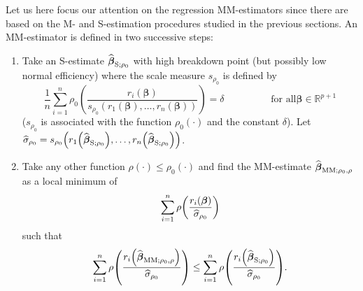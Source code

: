 Let us here focus our attention on the regression MM-estimators since there
are based on the M- and S-estimation procedures studied in the previous
sections. An MM-estimator is defined in two successive steps:

\begin{enumerate}
\item Take an S-estimate $\widehat{\boldsymbol\beta}_{\mathrm{S};\rho_{0}}$
with high breakdown point (but possibly low normal efficiency) where the scale
measure $s_{\rho_{0}}$ is defined by
\[
\frac{1}{n}\sum_{i=1}^{n}\rho_{0}\left(  \frac{r_{i}\left(  \boldsymbol{\beta
}\right)  }{s_{\rho_{0}}\left(  r_{1}(\boldsymbol\beta),\ldots
,r_{n}(\boldsymbol\beta)\right)  }\right)  =\delta\hspace{2cm}\text{for all
}\boldsymbol\beta\in\mathbb{R}^{p+1}%
\]
($s_{\rho_{0}}$ is associated with the function $\rho_{0}\left(  \cdot\right)
$ and the constant $\delta$). Let $\sthat{\sigma}_{\rho_{0}}=s_{\rho_{0}%
}\left(  r_{1}\left(  \sthat{\boldsymbol\beta}_{\mathrm{S};\rho_{0}%
}\right)  ,\ldots,r_{n}\left(  \sthat{\boldsymbol\beta}_{\mathrm{S}%
;\rho_{0}}\right)  \right)  $.

\item Take any other function $\rho\left(  \cdot\right)  \leq\rho_{0}\left(
\cdot\right)  $ and find the MM-estimate $\sthat{\boldsymbol\beta%
}_{\mathrm{MM};\rho_{0},\rho}$ as a local minimum of
\begin{equation}
\sum_{i=1}^{n}\rho\left(  \frac{r_{i}\left(  \boldsymbol\beta\right)
}{\sthat{\sigma}_{\rho_{0}}}\right)  \label{eq:MM_min}%
\end{equation}
such that
\begin{equation}
\sum_{i=1}^{n}\rho\left(  \frac{r_{i}\left(  \sthat{\boldsymbol\beta%
}_{\mathrm{MM};\rho_{0},\rho}\right)  }{\sthat{\sigma}_{\rho_{0}}}\right)
\leq\sum_{i=1}^{n}\rho\left(  \frac{r_{i}\left(  \sthat{\boldsymbol\beta%
}_{\mathrm{S};\rho_{0}}\right)  }{\sthat{\sigma}_{\rho_{0}}}\right)  .
\label{eq:MM_inequality}%
\end{equation}

\end{enumerate}

